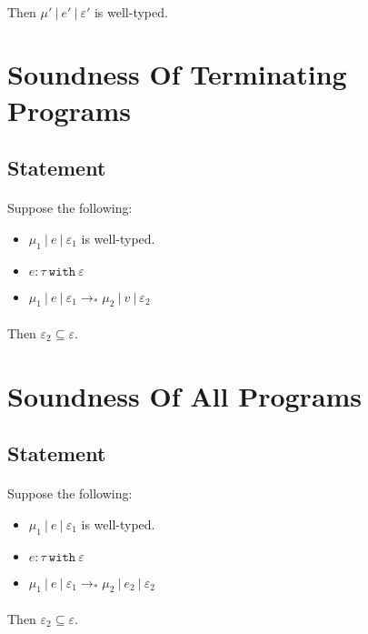 \documentclass{llncs}
\newcommand{\keywadj}[1]{\mathtt{#1}}
\newcommand{\keyw}[1]{\keywadj{#1}~}
\begin{document}
\paragraph{}
Then $\mu'~|~e'~|~\varepsilon'$ is well-typed.

\section{Soundness Of Terminating Programs}

\subsection{Statement}

\paragraph{}
Suppose the following:
\begin{itemize}
	\item $\mu_1~|~e~|~\varepsilon_1$ is well-typed.
	\item $e : \tau~\keyw{with} \varepsilon$
	\item $\mu_1~|~e~|~\varepsilon_1 \longrightarrow_* \mu_2~|~v~|~\varepsilon_2$
\end{itemize}

\paragraph{}
Then $\varepsilon_2 \subseteq \varepsilon$.


\section{Soundness Of All Programs}

\subsection{Statement}

\paragraph{}
Suppose the following:
\begin{itemize}
	\item $\mu_1~|~e~|~\varepsilon_1$ is well-typed.
	\item $e : \tau~\keyw{with} \varepsilon$
	\item $\mu_1~|~e~|~\varepsilon_1 \longrightarrow_* \mu_2~|~e_2~|~\varepsilon_2$
\end{itemize}

\paragraph{}
Then $\varepsilon_2 \subseteq \varepsilon$.
\end{document}
